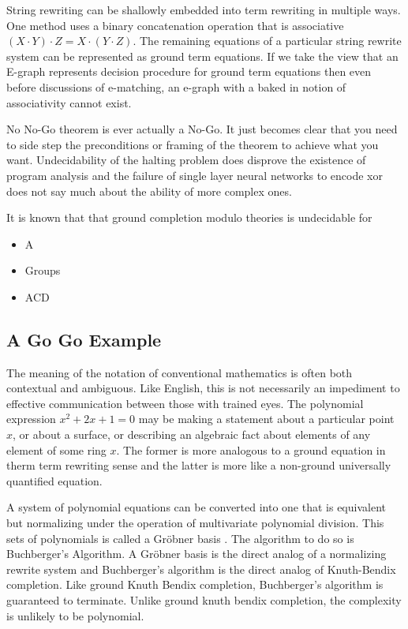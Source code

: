 
String rewriting can be shallowly embedded into term rewriting in multiple ways. One method uses a binary concatenation  operation that is associative $(X \cdot Y) \cdot Z = X \cdot (Y \cdot Z)$. The remaining equations of a particular string rewrite system can be represented as ground term equations. If we take the view that an E-graph represents decision procedure for ground term equations then even before discussions of e-matching, an e-graph with a baked in notion of associativity cannot exist.

No No-Go theorem is ever actually a No-Go. It just becomes clear that you need to side step the preconditions or framing of the theorem to achieve what you want. Undecidability of the halting problem does disprove the existence of program analysis and the failure of single layer neural networks to encode xor does not say much about the ability of more complex ones.

It is known that \cite{MARCHE1996253} that ground completion modulo theories is undecidable for

\begin{itemize}
\item A
\item Groups
\item ACD
\end{itemize}

\subsection{A Go Go Example}

The meaning of the notation of conventional mathematics is often both contextual and ambiguous. Like English, this is not necessarily an impediment to effective communication between those with trained eyes. The polynomial expression $x^2 + 2x + 1 = 0$ may be making a statement about a particular point $x$, or about a surface, or describing an algebraic fact about elements of any element of some ring $x$. The former is more analogous to a ground equation in therm term rewriting sense and the latter is more like a non-ground universally quantified equation.

A system of polynomial equations can be converted into one that is equivalent but normalizing under the operation of multivariate polynomial division. This sets of polynomials is called a Gr\"{o}bner basis \cite{Cox2015}. The algorithm to do so is Buchberger's Algorithm.
A Gr\"{o}bner basis is the direct analog of a normalizing rewrite system and Buchberger's algorithm is the direct analog of Knuth-Bendix completion.
Like ground Knuth Bendix completion, Buchberger's algorithm is guaranteed to terminate. Unlike ground knuth bendix completion, the complexity is unlikely to be polynomial.

